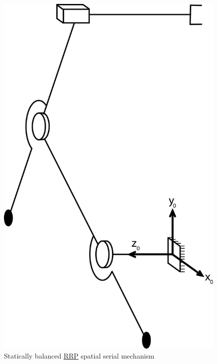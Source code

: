 \documentclass[a4paper,11pt,brazil,fleqn]{article}
\begin{document}
\begin{figure}[H]
	\centering
	\includegraphics[scale=0.11]{RRP.jpg}  
	\caption{Statically balanced \underline{RRP} spatial serial mechanism}
	\label{fig:RRP}
\end{figure}
\end{document}
